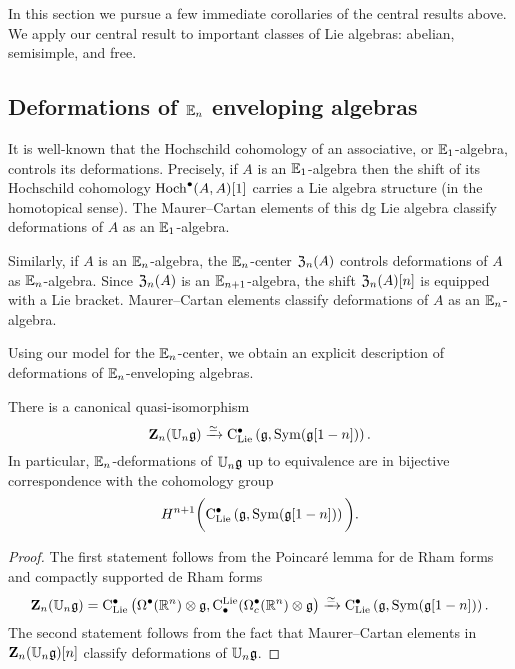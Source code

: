 \documentclass[11pt]{amsart}
\numberwithin{equation}{section}
\begin{document}
In this section we pursue a few immediate corollaries of the central results above.
We apply our central result to important classes of Lie algebras: 
abelian, semisimple, and free.

\subsection{Deformations of $\mathbb E_n$ enveloping algebras}
It is well-known that the Hochschild cohomology of an associative, or $\mathbb E_1$-algebra, controls its deformations. 
Precisely, if $A$ is an $\mathbb E_1$-algebra then the shift of its Hochschild cohomology ${\rm Hoch}^\bullet (A , A)[1]$ carries a Lie algebra structure (in the homotopical sense). 
The Maurer--Cartan elements of this dg Lie algebra classify deformations of $A$ as an $\mathbb E_1$-algebra. 

Similarly, if $A$ is an $\mathbb E_n$-algebra, the $\mathbb E_n$-center $\mathfrak Z_n(A)$ controls deformations of $A$ as $\mathbb E_n$-algebra. 
Since $\mathfrak Z_n(A)$ is an $\mathbb E_{n+1}$-algebra, the shift $\mathfrak Z_n(A)[n]$ is equipped with a Lie bracket. 
Maurer--Cartan elements classify deformations of $A$ as an $\mathbb E_{n}$-algebra. 

Using our model for the $\mathbb E_n$-center, we obtain an explicit description 
of deformations of $\mathbb E_n$-enveloping algebras. 

\begin{prp}\label{prop:def}
There is a canonical quasi-isomorphism 
\begin{equation}\label{eqn:def}
\mathbf Z_n(\mathbb U_n \mathfrak g) \xrightarrow{\simeq} {\rm C}_{\rm Lie}^\bullet\left(\mathfrak g, {\rm Sym}(\mathfrak g[1-n]) \right) .
\end{equation}
In particular, $\mathbb E_n$-deformations of $\mathbb U_n \mathfrak g$ up to equivalence are in bijective correspondence with the cohomology group
\[
H^{n+1} \bigg({\rm C}_{{\rm Lie}}^\bullet \left(\mathfrak g , {\rm Sym}(\mathfrak g[1-n]) \right) \bigg).
\]
\end{prp}
\begin{proof}
The first statement follows from the Poincar\'{e} lemma for de Rham forms and compactly supported de Rham forms
\[
\mathbf Z_n(\mathbb U_n \mathfrak g) = {\rm C}_{{\rm Lie}}^\bullet\left(\Omega^\bullet(\mathbb R^n) \otimes \mathfrak g, {\rm C}^{\rm Lie}_\bullet(\Omega^\bullet_c (\mathbb R^n) \otimes \mathfrak g\right) \xrightarrow{\simeq} {\rm C}_{\rm Lie}^\bullet\left(\mathfrak g, {\rm Sym}(\mathfrak g[1-n]) \right) .
\]
The second statement follows from the fact that Maurer--Cartan elements in $\mathbf Z_n(\mathbb U_n \mathfrak g)[n]$ classify deformations of $\mathbb U_n \mathfrak g$. 
\end{proof}
\end{document}
